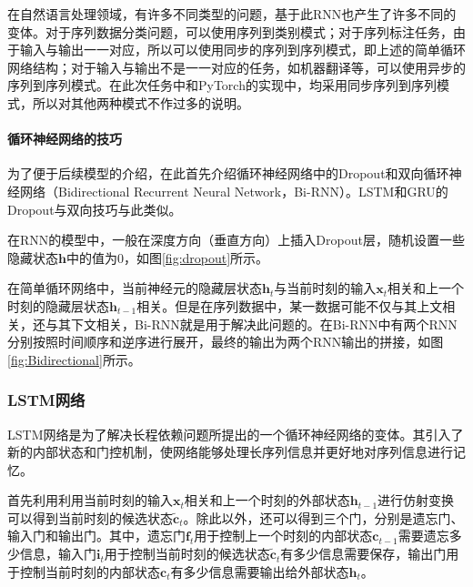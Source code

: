 

在自然语言处理领域，有许多不同类型的问题，基于此RNN也产生了许多不同的变体。对于序列数据分类问题，可以使用序列到类别模式；对于序列标注任务，由于输入与输出一一对应，所以可以使用同步的序列到序列模式，即上述的简单循环网络结构；对于输入与输出不是一一对应的任务，如机器翻译等，可以使用异步的序列到序列模式。在此次任务中和PyTorch的实现中，均采用同步序列到序列模式，所以对其他两种模式不作过多的说明。

\paragraph{循环神经网络的技巧}

为了便于后续模型的介绍，在此首先介绍循环神经网络中的Dropout和双向循环神经网络（Bidirectional Recurrent Neural Network，Bi-RNN）。LSTM和GRU的Dropout与双向技巧与此类似。

在RNN的模型中，一般在深度方向（垂直方向）上插入Dropout层，随机设置一些隐藏状态$\boldsymbol h$中的值为0，如图\ref{fig:dropout}所示。



在简单循环网络中，当前神经元的隐藏层状态$\boldsymbol {h}_t$与当前时刻的输入$\boldsymbol     {x}_t$相关和上一个时刻的隐藏层状态$\boldsymbol     {h}_{t-1}$相关。但是在序列数据中，某一数据可能不仅与其上文相关，还与其下文相关，Bi-RNN就是用于解决此问题的。在Bi-RNN中有两个RNN分别按照时间顺序和逆序进行展开，最终的输出为两个RNN输出的拼接，如图\ref{fig:Bidirectional}所示。



\subsubsection{LSTM网络}

LSTM网络是为了解决长程依赖问题所提出的一个循环神经网络的变体。其引入了新的内部状态和门控机制，使网络能够处理长序列信息并更好地对序列信息进行记忆。

首先利用利用当前时刻的输入$\boldsymbol     {x}_t$相关和上一个时刻的外部状态$\boldsymbol {h}_{t-1}$进行仿射变换可以得到当前时刻的候选状态$\tilde{\boldsymbol {c}}_t$。除此以外，还可以得到三个门，分别是遗忘门、输入门和输出门。其中，遗忘门$\boldsymbol f_t$用于控制上一个时刻的内部状态$\boldsymbol  {c}_{t-1}$需要遗忘多少信息，输入门$\boldsymbol i_t$用于控制当前时刻的候选状态$\tilde{\boldsymbol  {c}}_t$有多少信息需要保存，输出门用于控制当前时刻的内部状态$\boldsymbol  {c}_t$有多少信息需要输出给外部状态$\boldsymbol  {h}_t$。

